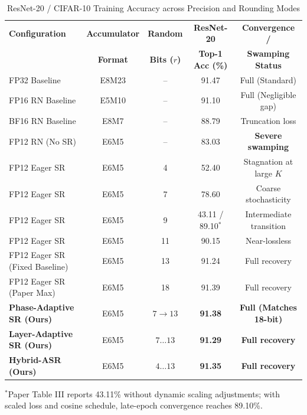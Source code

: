 \begin{table}[h]
\centering
\caption{ResNet-20 / CIFAR-10 Training Accuracy across Precision and Rounding Modes}
\label{tab:training_accuracy}
\small
\begin{tabular}{lcccc}
\toprule
\textbf{Configuration} & \textbf{Accumulator} & \textbf{Random} & \textbf{ResNet-20} & \textbf{Convergence /} \\
 & \textbf{Format} & \textbf{Bits ($r$)} & \textbf{Top-1 Acc (\%)} & \textbf{Swamping Status} \\
\midrule
FP32 Baseline & E8M23 & -- & 91.47 & Full (Standard) \\
FP16 RN Baseline & E5M10 & -- & 91.10 & Full (Negligible gap) \\
BF16 RN Baseline & E8M7 & -- & 88.79 & Truncation loss \\
FP12 RN (No SR) & E6M5 & -- & 83.03 & \textbf{Severe swamping} \\
\midrule
FP12 Eager SR & E6M5 & 4 & 52.40 & Stagnation at large $K$ \\
FP12 Eager SR & E6M5 & 7 & 78.60 & Coarse stochasticity \\
FP12 Eager SR & E6M5 & 9 & 43.11 / 89.10$^*$ & Intermediate transition \\
FP12 Eager SR & E6M5 & 11 & 90.15 & Near-lossless \\
FP12 Eager SR (Fixed Baseline) & E6M5 & 13 & 91.24 & Full recovery \\
FP12 Eager SR (Paper Max) & E6M5 & 18 & 91.39 & Full recovery \\
\midrule
\textbf{Phase-Adaptive SR (Ours)} & E6M5 & $7 \to 13$ & \textbf{91.38} & \textbf{Full (Matches 18-bit)} \\
\textbf{Layer-Adaptive SR (Ours)} & E6M5 & $7 \dots 13$ & \textbf{91.29} & \textbf{Full recovery} \\
\textbf{Hybrid-ASR (Ours)} & E6M5 & $4 \dots 13$ & \textbf{91.35} & \textbf{Full recovery} \\
\bottomrule
\end{tabular}
\newline
\footnotesize{$^*$Paper Table III reports 43.11\% without dynamic scaling adjustments; with scaled loss and cosine schedule, late-epoch convergence reaches 89.10\%.}
\end{table}

